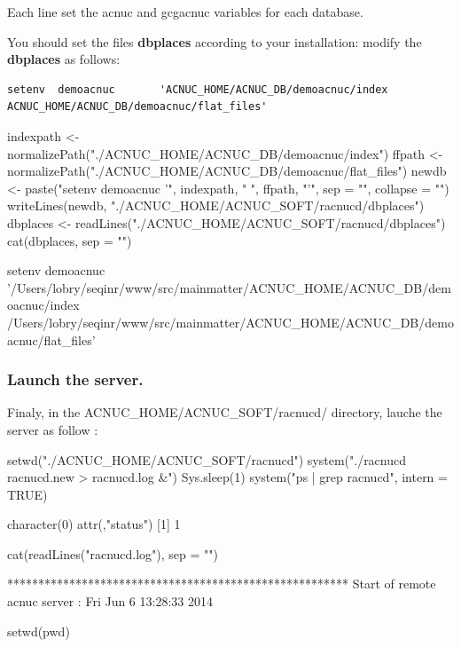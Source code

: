 \documentclass{article}
\begin{document}
Each line set the acnuc and gcgacnuc variables for each   database.


You should set the files \textbf{dbplaces}  according to your installation:
 modify  the \textbf{dbplaces} as follows:
\begin{verbatim}
setenv  demoacnuc       'ACNUC_HOME/ACNUC_DB/demoacnuc/index ACNUC_HOME/ACNUC_DB/demoacnuc/flat_files'
\end{verbatim}

\begin{Schunk}
\begin{Sinput}
 indexpath <- normalizePath("./ACNUC_HOME/ACNUC_DB/demoacnuc/index")
 ffpath <- normalizePath("./ACNUC_HOME/ACNUC_DB/demoacnuc/flat_files")
 newdb <- paste("setenv demoacnuc '", indexpath, " ", ffpath, "'", sep = "", collapse = "")
 writeLines(newdb, "./ACNUC_HOME/ACNUC_SOFT/racnucd/dbplaces")
 dbplaces <- readLines("./ACNUC_HOME/ACNUC_SOFT/racnucd/dbplaces")
 cat(dbplaces, sep = "\n")
\end{Sinput}
\begin{Soutput}
setenv demoacnuc '/Users/lobry/seqinr/www/src/mainmatter/ACNUC_HOME/ACNUC_DB/demoacnuc/index /Users/lobry/seqinr/www/src/mainmatter/ACNUC_HOME/ACNUC_DB/demoacnuc/flat_files'
\end{Soutput}
\end{Schunk}

\subsubsection{Launch the server.}


Finaly, in the ACNUC\_HOME/ACNUC\_SOFT/racnucd/ directory, lauche the server as follow :

\begin{Schunk}
\begin{Sinput}
 setwd("./ACNUC_HOME/ACNUC_SOFT/racnucd")
 system("./racnucd racnucd.new > racnucd.log &")
 Sys.sleep(1)
 system("ps | grep racnucd", intern = TRUE)
\end{Sinput}
\begin{Soutput}
character(0)
attr(,"status")
[1] 1
\end{Soutput}
\begin{Sinput}
 cat(readLines("racnucd.log"), sep = "\n")
\end{Sinput}
\begin{Soutput}
*******************************************************
Start of remote acnuc server : Fri Jun  6 13:28:33 2014
\end{Soutput}
\begin{Sinput}
 setwd(pwd)
\end{Sinput}
\end{Schunk}
\end{document}
